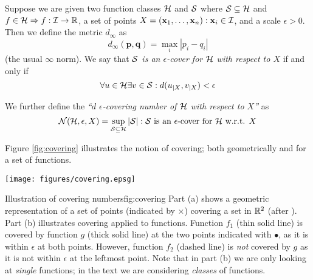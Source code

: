 \begin{definition}
\label{def:covering}
\label{def:covering numbers}
Suppose we are given two function classes $\mathcal{H}$ and $\mathcal{S}$ where $\mathcal{S}
\subseteq \mathcal{H}$ and $f \in \mathcal{H} \Rightarrow f : \mathcal{I} \rightarrow
\mathbb{R}$, a set of points $X = (\mathbf{x}_1, \ldots, \mathbf{x}_n) : \mathbf{x}_i \in
\mathcal{I}$, and a scale $\epsilon > 0$.  Then we define the metric
$d_{\infty}$ as 
%
\begin{equation}
d_{\infty}(\mathbf{p}, \mathbf{q}) = \max_{i} |p_i - q_i|
\end{equation}
%
(the usual $\infty$ norm).  We say that \emph{$\mathcal{S}$ is an
$\epsilon$-cover for $\mathcal{H}$ with respect to $X$} if and only if 
%
\begin{equation}
\forall u \in \mathcal{H} \exists v \in \mathcal{S} : d(u_{|X}, v_{|X}) < \epsilon
\end{equation}

We further define the \emph{``$d$ $\epsilon$-covering number of
$\mathcal{H}$ with respect to $X$''} as
% 
\begin{equation}
\mathcal{N}({\mathcal{H}}, {\epsilon}, {X}) = \sup_{\mathcal{S} \subseteq
\mathcal{H}}|\mathcal{S}| : \mbox{$\mathcal{S}$ is an $\epsilon$-cover for $\mathcal{H}$
w.r.t. $X$}
\end{equation}
\end{definition}

Figure \ref{fig:covering} illustrates the notion of covering; both
geometrically and for a set of functions.

\begin{linefigure}
\begin{center}
\texttt{[image: figures/covering.epsg]}
\end{center}
\begin{capt}{Illustration of covering numbers}{fig:covering}
Part (a) shows a geometric representation of a set of points
(indicated by $\times$) covering a set in $\mathbb{R}^2$ (after
\cite{Anthony98}).  Part (b) illustrates covering applied to
functions.  Function $f_1$ (thin solid line) is covered by function
$g$ (thick solid line) at the two points indicated with $\bullet$, as
it is within $\epsilon$ at both points. However, function $f_2$
(dashed line) is \emph{not} covered by $g$ as it is not within
$\epsilon$ at the leftmost point.  Note that in part (b) we are only
looking at \emph{single} functions; in the text we are considering
\emph{classes} of functions.
\end{capt}
\end{linefigure}

